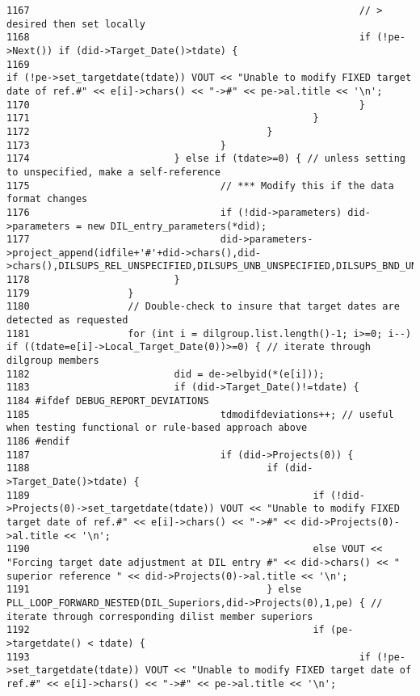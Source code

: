 \begin{verbatim}
1167                                                         // > desired then set locally
1168                                                         if (!pe->Next()) if (did->Target_Date()>tdate) {
1169                                                                 if (!pe->set_targetdate(tdate)) VOUT << "Unable to modify FIXED target date of ref.#" << e[i]->chars() << "->#" << pe->al.title << '\n';
1170                                                         }
1171                                                 }
1172                                         }
1173                                 }
1174                         } else if (tdate>=0) { // unless setting to unspecified, make a self-reference
1175                                 // *** Modify this if the data format changes
1176                                 if (!did->parameters) did->parameters = new DIL_entry_parameters(*did);
1177                                 did->parameters->project_append(idfile+'#'+did->chars(),did->chars(),DILSUPS_REL_UNSPECIFIED,DILSUPS_UNB_UNSPECIFIED,DILSUPS_BND_UNSPECIFIED,tdate,0,DILSUPS_URG_UNSPECIFIED,DILSUPS_PRI_UNSPECIFIED);
1178                         }
1179                 }
1180                 // Double-check to insure that target dates are detected as requested
1181                 for (int i = dilgroup.list.length()-1; i>=0; i--) if ((tdate=e[i]->Local_Target_Date(0))>=0) { // iterate through dilgroup members
1182                         did = de->elbyid(*(e[i]));
1183                         if (did->Target_Date()!=tdate) {
1184 #ifdef DEBUG_REPORT_DEVIATIONS
1185                                 tdmodifdeviations++; // useful when testing functional or rule-based approach above
1186 #endif
1187                                 if (did->Projects(0)) {
1188                                         if (did->Target_Date()>tdate) {
1189                                                 if (!did->Projects(0)->set_targetdate(tdate)) VOUT << "Unable to modify FIXED target date of ref.#" << e[i]->chars() << "->#" << did->Projects(0)->al.title << '\n';
1190                                                 else VOUT << "Forcing target date adjustment at DIL entry #" << did->chars() << " superior reference " << did->Projects(0)->al.title << '\n';
1191                                         } else PLL_LOOP_FORWARD_NESTED(DIL_Superiors,did->Projects(0),1,pe) { // iterate through corresponding dilist member superiors
1192                                                 if (pe->targetdate() < tdate) {
1193                                                         if (!pe->set_targetdate(tdate)) VOUT << "Unable to modify FIXED target date of ref.#" << e[i]->chars() << "->#" << pe->al.title << '\n';

\end{verbatim}
